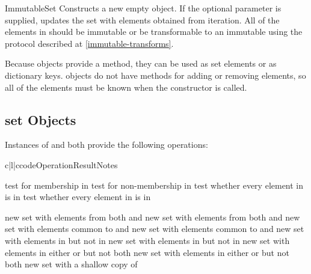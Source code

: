 \begin{classdesc}{ImmutableSet}{}
Constructs a new empty  object.  If the optional
 parameter is supplied, updates the set with elements obtained
from iteration.  All of the elements in  should be immutable or
be transformable to an immutable using the protocol described at
\ref{immutable-transforms}.

Because  objects provide a  method,
they can be used as set elements or as dictionary keys.  
objects do not have methods for adding or removing elements, so all of the
elements must be known when the constructor is called.
\end{classdesc}


\subsection{set Objects}

Instances of  and  both provide
the following operations:

\begin{tableiii}{c|l|c}{code}{Operation}{Result}{Notes}

  \hline
          {test  for membership in }{}
          {test  for non-membership in }{}
          {test whether every element in  is in }{}
          {test whether every element in  is in }{}

  \hline
          {new set with elements from both  and }{}
          {new set with elements from both  and }{}
          {new set with elements common to  and }{}
          {new set with elements common to  and }{}
          {new set with elements in  but not in }{}
          {new set with elements in  but not in }{}
          {new set with elements in either  or  but not both}{}
          {new set with elements in either  or  but not both}{}
          {new set with a shallow copy of }{}
\end{tableiii}

